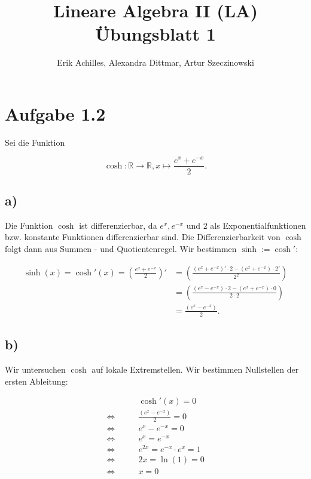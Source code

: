 \documentclass{article}
\title{Lineare Algebra II (LA) Übungsblatt 1}
\author{Erik Achilles, Alexandra Dittmar, Artur Szeczinowski}
\newcommand{\RR}{\mathbb{R}}
\begin{document}
\maketitle

\section*{Aufgabe 1.2}

Sei die Funktion

\[
\cosh : \RR \to \RR ,
x \mapsto \frac{e^x + e^{ - x}}{2}.
\]

\subsection*{a)}

Die Funktion 
$ \cosh $
ist differenzierbar, da
$ e^x, e^{ - x} $
und
$ 2 $
als Exponentialfunktionen bzw. konstante Funktionen differenzierbar sind. Die Differenzierbarkeit von 
$ \cosh $
folgt dann aus Summen - und Quotientenregel.
Wir bestimmen 
$ \sinh := \cosh' $:

\[
\begin{aligned}
    \sinh(x) = \cosh'(x)
    =
    \left(\frac{e^x + e^{ - x}}{2}\right)'
    & =
    \left( \frac{(e^x + e^{- x})' \cdot 2 -
    (e^x + e^{ - x}) \cdot 2'}{2^2} \right)
    \\ &=
    \left( \frac{(e^x - e^{- x}) \cdot 2 -
    (e^x + e^{ - x}) \cdot 0}{2 \cdot 2} \right)
    \\ &=
    \frac{(e^x - e^{ - x})}{2}.
\end{aligned}
\]

\newpage

\subsection*{b)}

Wir untersuchen 
$ \cosh $
auf lokale Extremstellen.
Wir bestimmen Nullstellen der ersten Ableitung:

\[
\begin{aligned}
    &\cosh'(x) = 0
    \\ \Leftrightarrow \qquad &
    \frac{(e^x - e^{ - x})}{2} = 0
    \\ \Leftrightarrow \qquad &
    e^x - e^{ - x} = 0
    \\ \Leftrightarrow \qquad &
    e^x = e^{ - x}
    \\ \Leftrightarrow \qquad &
    e^{2x} = e^{ - x} \cdot e^x = 1
    \\ \Leftrightarrow \qquad &
    2x = \ln(1) = 0
    \\ \Leftrightarrow \qquad &
    x = 0
\end{aligned}
\]
\end{document}
